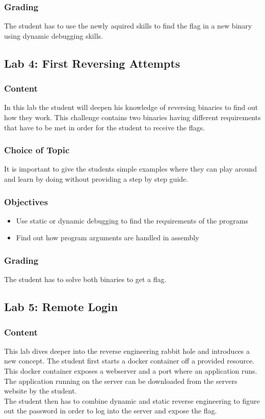 \subsubsection*{Grading}
The student has to use the newly aquired skills to find the flag in a new binary using dynamic debugging skills.


\subsection{Lab 4: First Reversing Attempts}
\subsubsection*{Content}
In this lab the student will deepen his knowledge of reversing binaries to find out how they work. This challenge contains two binaries having different requirements that have to be met in order for the student to receive the flags.
\subsubsection*{Choice of Topic}
It is important to give the students simple examples where they can play around and learn by doing without providing a step by step guide.
\subsubsection*{Objectives}
\begin{itemize}
    \item Use static or dynamic debugging to find the requirements of the programs
    \item Find out how program arguments are handled in assembly
\end{itemize}
\subsubsection*{Grading}
The student has to solve both binaries to get a flag.


\subsection{Lab 5: Remote Login}
\subsubsection*{Content}
This lab dives deeper into the reverse engineering rabbit hole and introduces a new concept. The student first starts a docker container off a provided resource.
This docker container exposes a webserver and a port where an application runs. The application running on the server can be downloaded from the servers website by the student. \\
The student then has to combine dynamic and static reverse engineering to figure out the password in order to log into the server and expose the flag.
